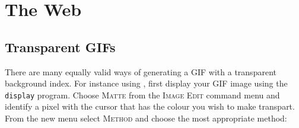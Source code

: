 \documentclass[twoside,11pt]{starlink}
\begin{document}


\section{The Web\label{sc15_web}}





\subsection{Transparent GIFs\label{sc15_transparent}}

There are many equally valid ways of generating a GIF with a
transparent background index. For instance using
, first display your GIF image using
the \texttt{display} program. Choose \textsc{Matte} from the \textsc{Image
Edit} command menu and identify a pixel with the cursor that has the
colour you wish to make transpart. From the new menu select \textsc{Method} and choose the most appropriate method:
\end{document}
